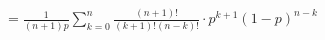 \documentclass[preview]{standalone}
\begin{document}
\begin{align*}
= \frac{1}{(n+1)p} \sum_{k=0}^{n} \frac{(n+1)!}{(k+1)!(n-k)!} \cdot p^{k+1} (1-p)^{n-k}
\end{align*}
\end{document}
